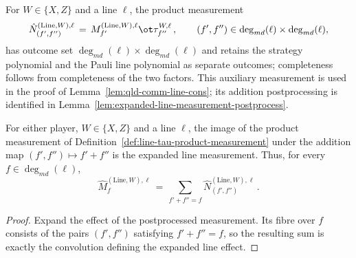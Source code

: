 \begin{definition}
	\label{def:line-tau-product-measurement}
	\leanok
	For $W \in \{X,Z\}$ and a line $\ell$, the product measurement
	\[
		\hat{N}^{(\mathrm{Line},W),\ell}_{(f',f'')}
		\,=\, M^{(\mathrm{Line},W),\ell}_{f'} \ot \tau^{W,\ell}_{f''}\,,
		\qquad (f',f'') \in \deg_{md}(\ell) \times \deg_{md}(\ell),
	\]
	has outcome set $\deg_{md}(\ell) \times \deg_{md}(\ell)$ and retains the
	strategy polynomial and the Pauli line polynomial as separate outcomes;
	completeness follows from completeness of the two factors.
	This auxiliary measurement is used in the proof of
	Lemma~\ref{lem:qld-comm-line-cons}; its addition postprocessing is identified
	in Lemma~\ref{lem:expanded-line-measurement-postprocess}.
\end{definition}

\begin{lemma}
	\label{lem:expanded-line-measurement-postprocess}
	\leanok
	For either player, $W \in \{X,Z\}$ and a line $\ell$, the image of the
	product measurement of Definition~\ref{def:line-tau-product-measurement}
	under the addition map $(f',f'') \mapsto f'+f''$ is the expanded line
	measurement. Thus, for every $f \in \deg_{md}(\ell)$,
	\[
		\hat{M}^{(\mathrm{Line},W),\ell}_f
		\,=\, \sum_{f'+f''=f} \hat{N}^{(\mathrm{Line},W),\ell}_{(f',f'')}\,.
	\]
\end{lemma}
\begin{proof}
	\leanok
	Expand the effect of the postprocessed measurement. Its fibre over $f$
	consists of the pairs $(f',f'')$ satisfying $f'+f''=f$, so the resulting sum
	is exactly the convolution defining the expanded line effect.
\end{proof}

